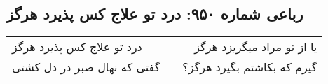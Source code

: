 \begin{center}
\section*{رباعی شماره ۹۵۰: درد تو علاج کس پذیرد هرگز}
\label{sec:0950}
\begin{longtable}{l p{0.5cm} r}
درد تو علاج کس پذیرد هرگز
&&
یا از تو مراد میگریزد هرگز
\\
گفتی که نهال صبر در دل کشتی
&&
گیرم که بکاشتم بگیرد هرگز؟
\\
\end{longtable}
\end{center}
